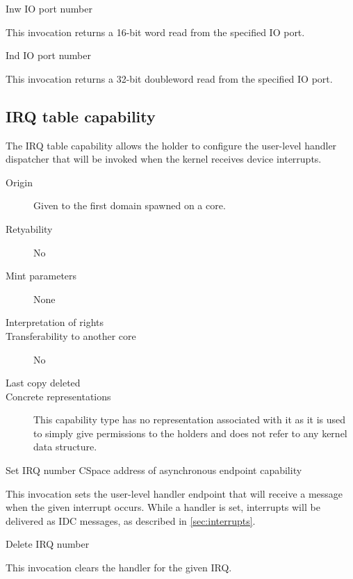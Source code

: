 \begin{invocation}{Inw}
  \arg IO port number
\end{invocation}
This invocation returns a 16-bit word read from the specified IO port.

\begin{invocation}{Ind}
  \arg IO port number
\end{invocation}
This invocation returns a 32-bit doubleword read from the specified IO port.

\subsection{IRQ table capability}
The IRQ table capability allows the holder to configure the user-level
handler dispatcher that will be invoked when the kernel receives
device interrupts.

\begin{description}
\item[Origin] Given to the first domain spawned on a core.
  
\item[Retyability] No
  
\item[Mint parameters] None
  
\item[Interpretation of rights] 
  
\item[Transferability to another core] No

\item[Last copy deleted] 
  
\item[Concrete representations] This capability type has no
  representation associated with it as it is used to simply give
  permissions to the holders and does not refer to any kernel data
  structure.
  \end{description}

\begin{invocation}{Set}
  \arg IRQ number
  \arg CSpace address of asynchronous endpoint capability
\end{invocation}
This invocation sets the user-level handler endpoint that will receive
a message when the given interrupt occurs.  While a handler is set,
interrupts will be delivered as IDC messages, as described in
\ref{sec:interrupts}.

\begin{invocation}{Delete}
  \arg IRQ number
\end{invocation}
This invocation clears the handler for the given IRQ.

